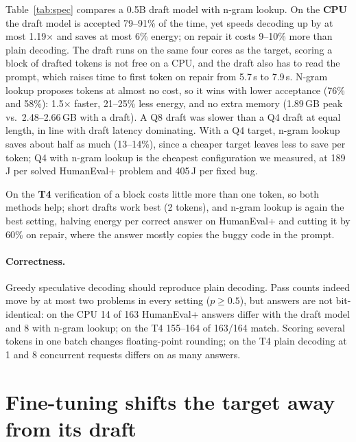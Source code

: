 \documentclass[11pt]{article}
\begin{document}
Table~\ref{tab:spec} compares a 0.5B draft model with n-gram lookup. On the \textbf{CPU} the draft
model is accepted 79--91\% of the time, yet speeds decoding up by at most 1.19$\times$ and saves at
most 6\% energy; on repair it costs 9--10\% more than plain decoding. The draft runs on the same four
cores as the target, scoring a block of drafted tokens is not free on a CPU, and the draft also
has to read the prompt, which raises time to first token on repair from 5.7\,s to 7.9\,s. N-gram
lookup proposes tokens at almost no cost, so it wins with lower acceptance (76\% and 58\%): 1.5$\times$
faster, 21--25\% less energy, and no extra memory (1.89\,GB peak vs.\ 2.48--2.66\,GB with a draft).
A Q8 draft was slower than a Q4 draft at equal length, in line with draft latency dominating.
With a Q4 target, n-gram lookup saves about half as much (13--14\%), since a cheaper target leaves
less to save per token; Q4 with n-gram lookup is the cheapest configuration we measured, at 189\,J
per solved HumanEval+ problem and 405\,J per fixed bug.

On the \textbf{T4} verification of a block costs little more than one token, so both methods
help; short drafts work best (2 tokens), and n-gram lookup is again the best setting, halving energy
per correct answer on HumanEval+ and cutting it by 60\% on repair, where the answer mostly copies the
buggy code in the prompt.

\paragraph{Correctness.} Greedy speculative decoding should reproduce plain decoding. Pass counts
indeed move by at most two problems in every setting ($p\geq0.5$), but answers are not bit-identical:
on the CPU 14 of 163 HumanEval+ answers differ with the draft model and 8 with n-gram lookup; on the
T4 155--164 of 163/164 match. Scoring several tokens in one batch changes floating-point rounding;
on the T4 plain decoding at 1 and 8 concurrent requests differs on as many answers.

\section{Fine-tuning shifts the target away from its draft}
\label{sec:shift}
\end{document}
